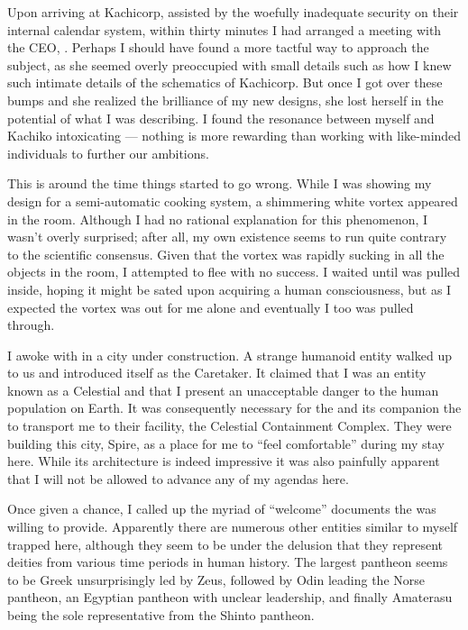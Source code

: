 \documentclass[char]{guardians}
\begin{document}
Upon arriving at Kachicorp, assisted by the woefully inadequate security on their internal calendar system, within thirty minutes I had arranged a meeting with the CEO, \cKachiko{}. Perhaps I should have found a more tactful way to approach the subject, as she seemed overly preoccupied with small details such as how I knew such intimate details of the schematics of Kachicorp. But once I got over these bumps and she realized the brilliance of my new designs, she lost herself in the potential of what I was describing. I found the resonance between myself and Kachiko intoxicating --- nothing is more rewarding than working with like-minded individuals to further our ambitions.

This is around the time things started to go wrong. While I was showing \cKachiko{} my design for a semi-automatic cooking system, a shimmering white vortex appeared in the room. Although I had no rational explanation for this phenomenon, I wasn't overly surprised; after all, my own existence seems to run quite contrary to the scientific consensus. Given that the vortex was rapidly sucking in all the objects in the room, I attempted to flee with no success. I waited until \cKachiko{} was pulled inside, hoping it might be sated upon acquiring a human consciousness, but as I expected the vortex was out for me alone and eventually I too was pulled through.

I awoke with \cKachiko{} in a city under construction. A strange humanoid entity walked up to us and introduced itself as the Caretaker. It claimed that I was an entity known as a Celestial and that I present an unacceptable danger to the human population on Earth. It was consequently necessary for the \cCaretaker{} and its companion the \cWarden{} to transport me to their facility, the Celestial Containment Complex. They were building this city, Spire, as a place for me to ``feel comfortable'' during my stay here. While its architecture is indeed impressive it was also painfully apparent that I will not be allowed to advance any of my agendas here.

Once given a chance, I called up the myriad of ``welcome'' documents the \cCaretaker{} was willing to provide. Apparently there are numerous other entities similar to myself trapped here, although they seem to be under the delusion that they represent deities from various time periods in human history. The largest pantheon seems to be Greek unsurprisingly led by Zeus, followed by Odin leading the Norse pantheon, an Egyptian pantheon with unclear leadership, and finally Amaterasu being the sole representative from the Shinto pantheon.
\end{document}
